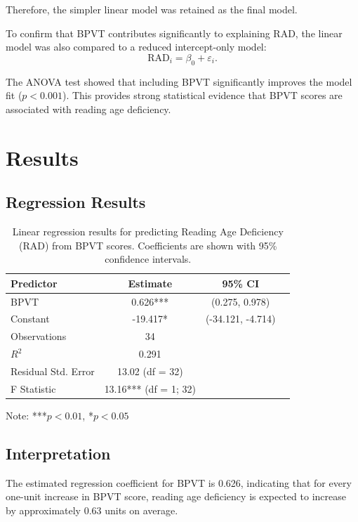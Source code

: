 \documentclass[11pt, a4paper]{article}
\begin{document}
Therefore, the simpler linear model was retained as the final model.

To confirm that BPVT contributes significantly to explaining RAD, the linear
model was also compared to a reduced intercept-only model:
\[
\text{RAD}_i = \beta_0 + \varepsilon_i.
\]

The ANOVA test showed that including BPVT significantly improves the model fit
($p < 0.001$). This provides strong statistical evidence that BPVT scores are
associated with reading age deficiency.

\section{Results} \label{sec:results}

\subsection{Regression Results}

\begin{table}[h!]
\centering
\caption{Linear regression results for predicting Reading Age Deficiency (RAD)
from BPVT scores. Coefficients are shown with 95\% confidence intervals.}
\begin{tabular}{lccc}
\toprule
Predictor & Estimate & 95\% CI \\
\midrule
BPVT & 0.626*** & (0.275, 0.978) \\
Constant & -19.417* & (-34.121, -4.714) \\
\midrule
Observations & 34 & \\
$R^2$ & 0.291 & \\
Residual Std. Error & 13.02 (df = 32) & \\
F Statistic & 13.16*** (df = 1; 32) & \\
\bottomrule
\end{tabular}

\smallskip
\footnotesize{Note: ***$p < 0.01$, *$p < 0.05$}
\end{table}

\subsection{Interpretation}

The estimated regression coefficient for BPVT is 0.626, indicating that for
every one-unit increase in BPVT score, reading age deficiency is expected to
increase by approximately 0.63 units on average.
\end{document}
